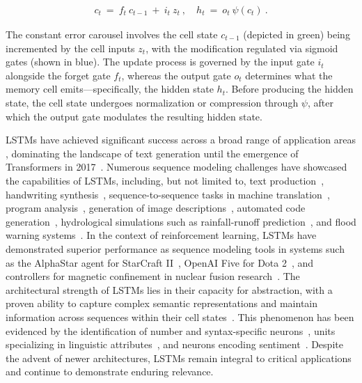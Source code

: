 \begin{align}
\label{eq:lstm_idea}
  c_t \ = \ f_t \ c_{t-1} \ + \ 
          i_t \  z_t \ , \quad  
          h_t \ = \ o_t \ \psi({c_t}) \ . 
\end{align}

The constant error carousel involves the cell state $c_{t-1}$ (depicted in green) being incremented by the cell inputs $z_t$, with the modification regulated via sigmoid gates (shown in blue). The update process is governed by the input gate $i_t$ alongside the forget gate $f_t$, whereas the output gate $o_t$ determines what the memory cell emits—specifically, the hidden state $h_t$. Before producing the hidden state, the cell state undergoes normalization or compression through $\psi$, after which the output gate modulates the resulting hidden state.

LSTMs have achieved significant success across a broad range of application areas \citep{Hochreiter:01,Hochreiter:07,Schmidhuber:15}, dominating the landscape of text generation until the emergence of Transformers in 2017~\citep{Vaswani:17}. Numerous sequence modeling challenges have showcased the capabilities of LSTMs, including, but not limited to, text production~\citep{Graves:13,Karpathy:15blog}, handwriting synthesis~\citep{Graves:13}, sequence-to-sequence tasks in machine translation~\citep{Sutskever:14nips}, program analysis~\citep{Zaremba:14arxiv}, generation of image descriptions~\citep{Karpathy:15,Hossain:19}, automated code generation~\citep{Karpathy:15blog}, hydrological simulations such as rainfall-runoff prediction~\citep{Kratzert:18,Kratzert:19}, and flood warning systems~\citep{Nearing:24}. In the context of reinforcement learning, LSTMs have demonstrated superior performance as sequence modeling tools in systems such as the AlphaStar agent for StarCraft II~\citep{Vinyals:17short}, OpenAI Five for Dota 2~\citep{OpenAI:19}, and controllers for magnetic confinement in nuclear fusion research~\citep{Degrave:22short}. The architectural strength of LSTMs lies in their capacity for abstraction, with a proven ability to capture complex semantic representations and maintain information across sequences within their cell states~\citep{Karpathy:15blog}. This phenomenon has been evidenced by the identification of number and syntax-specific neurons~\citep{Lakretz:19}, units specializing in linguistic attributes~\citep{Bau:19}, and neurons encoding sentiment~\citep{Radford:17arxiv}. Despite the advent of newer architectures, LSTMs remain integral to critical applications~\citep{Degrave:22short,Nearing:24} and continue to demonstrate enduring relevance.

